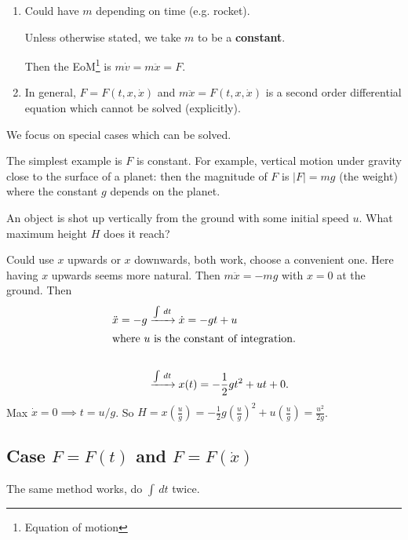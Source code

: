 \documentclass[10pt, a4paper]{article}
\begin{document}
\begin{remark}\phantom{}
    \begin{enumerate}[label = (\roman*)]
        \item Could have $m$ depending on time
        (e.g. rocket).

        Unless otherwise stated,
        we take $m$ to be a \textbf{constant}.

        Then the EoM\footnote{Equation of motion} is $m\dot{v} = m\ddot{x} = F$.

        \item In general,
        $F = F(t, x, \dot{x})$ and $m\ddot{x} = F(t, x, \dot{x})$ is a second order differential equation which cannot be solved
        (explicitly).
    \end{enumerate}
\end{remark}

We focus on special cases which can be solved.

The simplest example is $F$ is constant.
For example,
vertical motion under gravity close to the surface of a planet:
then the magnitude of $F$ is $|F| = mg$
(the weight)
where the constant $g$ depends on the planet.

\begin{example}
    An object is shot up vertically from the ground with some initial speed $u$.
    What maximum height $H$ does it reach?
    \begin{solution}
        Could use $x$ upwards or $x$ downwards,
        both work,
        choose a convenient one.
        Here having $x$ upwards seems more natural.
        Then $m\ddot{x} = -mg$ with $x = 0$ at the ground.
        Then
        \begin{align*}
            \ddot{x} = -g &\xrightarrow{\int\,dt} \dot{x} = -gt + u \\
            \intertext{where $u$ is the constant of integration.} \\
            &\xrightarrow{\int\,dt} x(t) = -\frac{1}{2}gt ^ 2 + ut + 0.
        \end{align*}
        Max $\dot{x} = 0 \implies t = u / g$.
        So $H = x\left(\frac{u}{g}\right) = -\frac{1}{2}g\left(\frac{u}{g}\right) ^ 2 + u\left(\frac{u}{g}\right) = \frac{u ^ 2}{2g}$.
    \end{solution}
\end{example}

\subsection{Case \texorpdfstring{$F = F(t)$}{} and \texorpdfstring{$F = F(\dot{x})$}{}}
The same method works,
do $\int\,dt$ twice.
\end{document}
